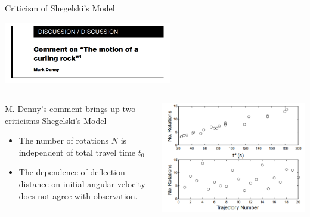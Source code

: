 \documentclass{beamer}
\begin{document}
\begin{frame}{Criticism of Shegelski's Model}
    \begin{center}
        \includegraphics[width=0.55\textwidth]{Images/Denny_Comment.png}
    \end{center}
    \begin{columns}
        \begin{column}{0.4\textwidth}
            M. Denny's comment brings up two criticisms Shegelski's Model
            \begin{itemize}
                \item The number of rotations $N$ is independent of total travel time $t_0$
                \item The dependence of deflection distance on initial angular velocity does not agree with observation.
            \end{itemize}

        \end{column}
        \begin{column}{0.59\textwidth}
            \begin{center}
                \includegraphics[width=1.0\textwidth]{Images/Denny_Comment_Plot.png}
            \end{center}
        \end{column}
    \end{columns}
\end{frame}
\end{document}

